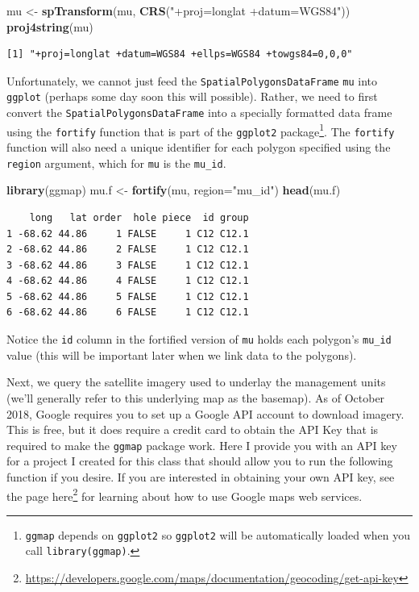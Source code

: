 \documentclass[
]{krantz}
\makeatletter
\newenvironment{Shaded}{\begin{snugshade}}{\end{snugshade}}
\newcommand{\DataTypeTok}[1]{\textcolor[rgb]{0.27,0.27,0.27}{#1}}
\newcommand{\KeywordTok}[1]{\textcolor[rgb]{0.27,0.27,0.27}{\textbf{#1}}}
\newcommand{\NormalTok}[1]{#1}
\newcommand{\StringTok}[1]{\textcolor[rgb]{0.5,0.5,0.5}{#1}}
\renewcommand{\href}[2]{#2\footnote{\url{#1}}}
\newenvironment{kframe}{%
\medskip{}
\setlength{\fboxsep}{.8em}
 \def\at@end@of@kframe{}%
 \ifinner\ifhmode%
  \def\at@end@of@kframe{\end{minipage}}%
  \begin{minipage}{\columnwidth}%
 \fi\fi%
 \def\FrameCommand##1{\hskip\@totalleftmargin \hskip-\fboxsep
 \colorbox{shadecolor}{##1}\hskip-\fboxsep
     \hskip-\linewidth \hskip-\@totalleftmargin \hskip\columnwidth}%
 \MakeFramed {\advance\hsize-\width
   \@totalleftmargin\z@ \linewidth\hsize
   \@setminipage}}%
 {\par\unskip\endMakeFramed%
 \at@end@of@kframe}
\renewenvironment{Shaded}{\begin{kframe}}{\end{kframe}}
\makeatother
\begin{document}
\begin{Shaded}
\begin{Highlighting}[]
\NormalTok{mu \textless{}{-}}\StringTok{ }\KeywordTok{spTransform}\NormalTok{(mu, }\KeywordTok{CRS}\NormalTok{(}\StringTok{"+proj=longlat +datum=WGS84"}\NormalTok{))}
\KeywordTok{proj4string}\NormalTok{(mu)}
\end{Highlighting}
\end{Shaded}

\begin{verbatim}
[1] "+proj=longlat +datum=WGS84 +ellps=WGS84 +towgs84=0,0,0"
\end{verbatim}

Unfortunately, we cannot just feed the \texttt{SpatialPolygonsDataFrame} \texttt{mu} into \texttt{ggplot} (perhaps some day soon this will possible). Rather, we need to first convert the \texttt{SpatialPolygonsDataFrame} into a specially formatted data frame using the \texttt{fortify} function that is part of the \texttt{ggplot2} package\footnote{\texttt{ggmap} depends on \texttt{ggplot2} so \texttt{ggplot2} will be automatically loaded when you call \texttt{library(ggmap)}.}. The \texttt{fortify} function will also need a unique identifier for each polygon specified using the \texttt{region} argument, which for \texttt{mu} is the \texttt{mu\_id}.

\begin{Shaded}
\begin{Highlighting}[]
\KeywordTok{library}\NormalTok{(ggmap)}
\NormalTok{mu.f \textless{}{-}}\StringTok{ }\KeywordTok{fortify}\NormalTok{(mu, }\DataTypeTok{region=}\StringTok{"mu\_id"}\NormalTok{)}
\KeywordTok{head}\NormalTok{(mu.f)}
\end{Highlighting}
\end{Shaded}

\begin{verbatim}
    long   lat order  hole piece  id group
1 -68.62 44.86     1 FALSE     1 C12 C12.1
2 -68.62 44.86     2 FALSE     1 C12 C12.1
3 -68.62 44.86     3 FALSE     1 C12 C12.1
4 -68.62 44.86     4 FALSE     1 C12 C12.1
5 -68.62 44.86     5 FALSE     1 C12 C12.1
6 -68.62 44.86     6 FALSE     1 C12 C12.1
\end{verbatim}

Notice the \texttt{id} column in the fortified version of \texttt{mu} holds each polygon's \texttt{mu\_id} value (this will be important later when we link data to the polygons).

Next, we query the satellite imagery used to underlay the management units (we'll generally refer to this underlying map as the basemap). As of October 2018, Google requires you to set up a Google API account to download imagery. This is free, but it does require a credit card to obtain the API Key that is required to make the \texttt{ggmap} package work. Here I provide you with an API key for a project I created for this class that should allow you to run the following function if you desire. If you are interested in obtaining your own API key, see the page \href{https://developers.google.com/maps/documentation/geocoding/get-api-key}{here} for learning about how to use Google maps web services.
\end{document}
